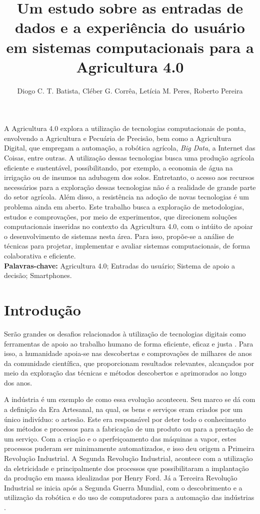 \documentclass[12pt]{article}
\title{Um estudo sobre as entradas de dados e a experiência do usuário em sistemas computacionais para a Agricultura 4.0}
\author{Diogo C. T. Batista\inst{1}, Cléber G. Corrêa\inst{1}, Letícia M. Peres\inst{2}, Roberto Pereira\inst{2}}
\begin{document}
 

\maketitle
     
\begin{resumo} 
A Agricultura 4.0 explora a utilização de tecnologias computacionais de ponta, envolvendo a Agricultura e Pecuária de Precisão, bem como a Agricultura Digital, que empregam a automação, a robótica agrícola, \textit{Big Data}, a Internet das Coisas, entre outras. A utilização dessas tecnologias busca uma produção agrícola eficiente e sustentável, possibilitando, por exemplo, a economia de água na irrigação ou de insumos na adubagem dos solos. Entretanto, o acesso aos recursos necessários para a exploração dessas tecnologias não é a realidade de grande parte do setor agrícola. Além disso, a resistência na adoção de novas tecnologias é um problema ainda em aberto. Este trabalho busca a exploração de metodologias, estudos e comprovações, por meio de experimentos, que direcionem soluções computacionais inseridas no contexto da Agricultura 4.0, com o intúito de apoiar o desenvolvimento de sistemas nesta área. Para isso, propõe-se a análise de técnicas para projetar, implementar e avaliar sistemas computacionais, de forma colaborativa e eficiente.\\

\textbf{Palavras-chave:} Agricultura 4.0; Entradas do usuário; Sistema de apoio a decisão; Smartphones.
\end{resumo}

\section{Introdução}
\label{sec:introducao}

Serão grandes os desafios relacionados à utilização de tecnologias digitais como ferramentas de apoio ao trabalho humano de forma eficiente, eficaz e justa \cite{Rose:2019}. Para isso, a humanidade apoia-se nas descobertas e comprovações de milhares de anos da comunidade científica, que proporcionam resultados relevantes, alcançados por meio da exploração das técnicas e métodos descobertos e aprimorados ao longo dos anos.

A indústria é um exemplo de como essa evolução aconteceu. Seu marco se dá com a definição da Era Artesanal, na qual, os bens e serviços eram criados por um único indivíduo: o artesão. Este era responsável por deter todo o conhecimento dos métodos e processos para a fabricação de um produto ou para a prestação de um serviço. Com a criação e o aperfeiçoamento das máquinas a vapor, estes processos puderam ser minimamente automatizados, e isso deu origem a Primeira Revolução Industrial. A Segunda Revolução Industrial, acontece com a utilização da eletricidade e principalmente dos processos que possibilitaram a implantação da produção em massa idealizadas por Henry Ford. Já a Terceira Revolução Industrial se inicia após a Segunda Guerra Mundial, com o descobrimento e a utilização da robótica e do uso de computadores para a automação das indústrias \cite{Souza:2017}.
\end{document}
